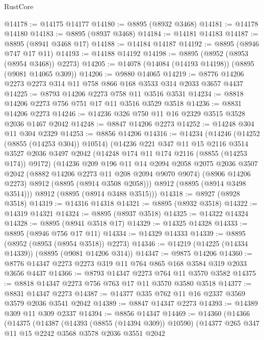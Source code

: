 \begin{lexlean}{RustCore}
\begin{coremodule}
@14178 := @14175 @14177
@14180 := @8895 (@8932 @3468)
@14181 := @14178 @14180
@14183 := @8895 (@8937 @3468)
@14184 := @14181 @14183
@14187 := @8895 (@8941 @3468 @17)
@14188 := @14184 @14187
@14192 := @8895 (@8946 @747 @17 @11)
@14193 := @14188 @14192
@14198 := @8895 (@8952 (@8953 (@8954 @3468)) @2273)
@14205 := @14078 (@14084 (@14193 @14198)) (@8895 (@9081 @14065 @309))
@14206 := @9880 @14065
@14219 := @8776 @14206 @2273 @2273 @314 @11 @758 @866 @168 @3533 @314 @2033 @3657 @4437
@14225 := @8793 @14206 @2273 @758 @11 @3516 @3531
@14234 := @8818 @14206 @2273 @756 @751 @17 @11 @3516 @3529 @3518
@14236 := @8831 @14206 @2273
@14246 := @14236 @326 @750 @11 @16 @2329 @3515 @3528 @2036 @1467 @2042
@14248 := @8847 @14206 @2273
@14252 := @14248 @304 @11 @304 @2329
@14253 := @8856 @14206
@14316 := @14234
    (@14246
      (@14252 (@8855 (@14253 @304)) @10514)
      (@14236
        @221
        @347
        @11
        @15
        @2116
        @3514
        @3527
        @2036
        @3497
        @2042
        (@14248 @174 @11 @174 @2116 (@8855 (@14253 @174)) @9172)
        (@14236
          @209
          @196
          @11
          @14
          @2094
          @2058
          @2075
          @2036
          @3507
          @2042
          (@8882 @14206 @2273 @11 @208 @2094 @9070 @9074)
          (@8906 @14206 @2273)
          @8912
          (@8895 (@8914 @3508 @2058)))
        @8912
        (@8895 (@8914 @3498 @3514)))
      @8912
      (@8895 (@8914 @3488 @3515)))
@14318 := @8927 (@8928 @3518)
@14319 := @14316 @14318
@14321 := @8895 (@8932 @3518)
@14322 := @14319 @14321
@14324 := @8895 (@8937 @3518)
@14325 := @14322 @14324
@14328 := @8895 (@8941 @3518 @17)
@14329 := @14325 @14328
@14333 := @8895 (@8946 @756 @17 @11)
@14334 := @14329 @14333
@14339 := @8895 (@8952 (@8953 (@8954 @3518)) @2273)
@14346 := @14219 (@14225 (@14334 @14339)) (@8895 (@9081 @14206 @314))
@14347 := @9875 @14206
@14360 := @8776 @14347 @2273 @2273 @319 @11 @764 @865 @168 @3584 @319 @2033 @3656 @4437
@14366 := @8793 @14347 @2273 @764 @11 @3570 @3582
@14375 := @8818 @14347 @2273 @756 @763 @17 @11 @3570 @3580 @3518
@14377 := @8831 @14347 @2273
@14387 := @14377 @335 @762 @11 @16 @2337 @3569 @3579 @2036 @3541 @2042
@14389 := @8847 @14347 @2273
@14393 := @14389 @309 @11 @309 @2337
@14394 := @8856 @14347
@14469 := @14360
    (@14366
      (@14375
        (@14387
          (@14393 (@8855 (@14394 @309)) @10590)
          (@14377
            @265
            @347
            @11
            @15
            @2242
            @3568
            @3578
            @2036
            @3551
            @2042

\end{coremodule}
\end{lexlean}
